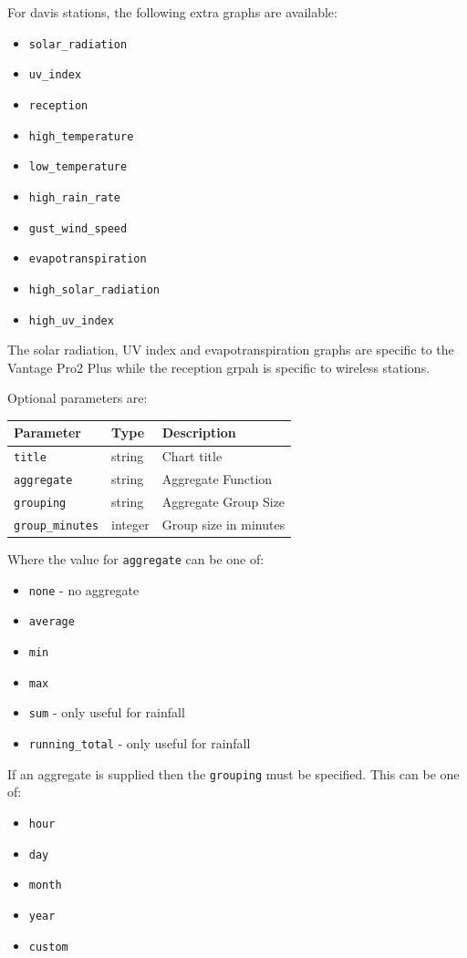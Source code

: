 \documentclass[a4paper,10pt]{book}
\begin{document}
For davis stations, the following extra graphs are available:
\begin{itemize}
\item \verb|solar_radiation|
\item \verb|uv_index|        
\item \verb|reception|
\item \verb|high_temperature|
\item \verb|low_temperature|
\item \verb|high_rain_rate|      
\item \verb|gust_wind_speed|
\item \verb|evapotranspiration|  
\item \verb|high_solar_radiation|
\item \verb|high_uv_index|
\end{itemize}
The solar radiation, UV index and evapotranspiration graphs are specific to the Vantage Pro2 Plus while the reception grpah is specific to wireless stations.

Optional parameters are:

\begin{tabular}{p{2.5cm} p{2.5cm} l}
\hline
\textbf{Parameter} & \textbf{Type} & \textbf{Description} \\
\hline
\verb|title| & string & Chart title \\
\verb|aggregate| & string & Aggregate Function \\
\verb|grouping| & string & Aggregate Group Size \\
\verb|group_minutes| & integer & Group size in minutes \\
\hline
\end{tabular}

Where the value for \verb|aggregate| can be one of:

\begin{itemize}
\item \verb|none| - no aggregate
\item \verb|average|
\item \verb|min|
\item \verb|max|
\item \verb|sum| - only useful for rainfall
\item \verb|running_total| - only useful for rainfall
\end{itemize}

If an aggregate is supplied then the \verb|grouping| must be specified. This can be one of:

\begin{itemize}
\item \verb|hour|
\item \verb|day|
\item \verb|month|
\item \verb|year|
\item \verb|custom|
\end{itemize}
\end{document}
